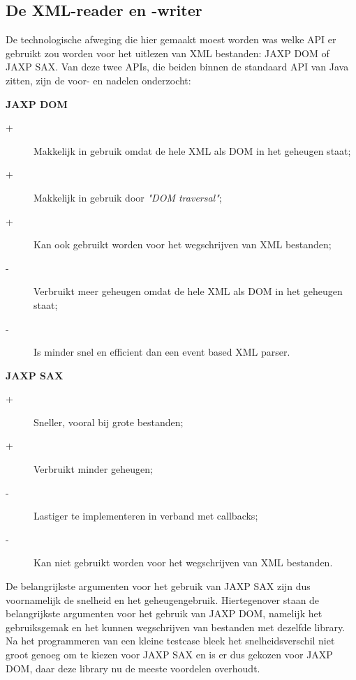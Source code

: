 \documentclass[a4paper,11pt]{article}
\begin{document}
\subsection{De XML-reader en -writer}
De technologische afweging die hier gemaakt moest worden was welke API er gebruikt zou worden voor het uitlezen van XML bestanden: JAXP DOM of JAXP SAX. Van deze twee APIs, die beiden binnen de standaard API van Java zitten, zijn de voor- en nadelen onderzocht:
\begin{description}
	\item \textbf{JAXP DOM}
		\begin{description}
			\item[+] Makkelijk in gebruik omdat de hele XML als DOM in het geheugen staat;
			\item[+] Makkelijk in gebruik door \textit{"DOM traversal"};
			\item[+] Kan ook gebruikt worden voor het wegschrijven van XML bestanden;
			\item[-] Verbruikt meer geheugen omdat de hele XML als DOM in het geheugen staat;
			\item[-] Is minder snel en efficient dan een event based XML parser.
		\end{description}
	\item \textbf{JAXP SAX}
		\begin{description}
			\item[+] Sneller, vooral bij grote bestanden;
			\item[+] Verbruikt minder geheugen;
			\item[-] Lastiger te implementeren in verband met callbacks;
			\item[-] Kan niet gebruikt worden voor het wegschrijven van XML bestanden.
		\end{description}
\end{description}

De belangrijkste argumenten voor het gebruik van JAXP SAX zijn dus voornamelijk de snelheid en het geheugengebruik. Hiertegenover staan de belangrijkste argumenten voor het gebruik van JAXP DOM, namelijk het gebruiksgemak en het kunnen wegschrijven van bestanden met dezelfde library. Na het programmeren van een kleine testcase bleek het snelheidsverschil niet groot genoeg om te kiezen voor JAXP SAX en is er dus gekozen voor JAXP DOM, daar deze library nu de meeste voordelen overhoudt.
\end{document}
